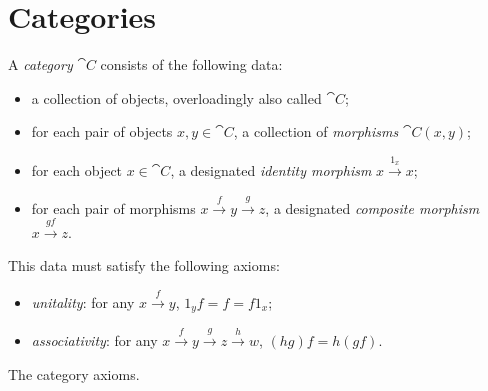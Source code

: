 
\section{Categories}


\begin{dfn}[Category]\label{def:category}
	A \emph{category} $\cat{C}$ consists of the following data:
	\begin{itemize}
		\item a collection of objects, overloadingly also called $\cat{C}$;
		\item for each pair of objects $x,y \in  \cat{C}$, a collection of \emph{morphisms} $\cat{C}(x, y)$;
		\item for each object $x \in \cat{C}$, a designated \emph{identity morphism} $x \xrightarrow{1_x}  x$;
		\item for each pair of morphisms $x \xrightarrow{f}  y \xrightarrow{g}  z$, a designated \emph{composite morphism} $x \xrightarrow{gf}  z$.
	\end{itemize}
	This data must satisfy the following axioms:
	\begin{itemize}
		\item \emph{unitality}: for any $x \xrightarrow{f}  y$, $1_yf = f = f1_x$;
		\item \emph{associativity}: for any $x \xrightarrow{f} 		y \xrightarrow{g} z \xrightarrow{h} w$, $(hg)f = h(gf)$.
	\end{itemize}
	\begin{fig}[H]
		\centering
		\caption{The category axioms.}
		\label{fig:category axioms}
	\end{fig}
\end{dfn}

